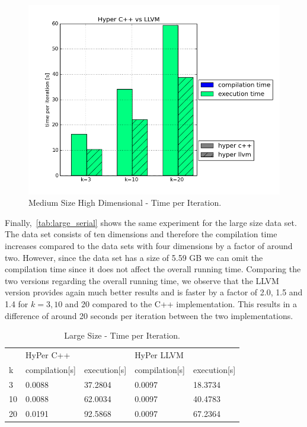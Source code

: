 \begin{figure}[htsb]
  \centering
  \includegraphics[scale=0.5, trim="0cm 1.5cm 0cm 0cm"]{figures/charts/hyper_15Mxhd}
  \caption[Medium Size High Dimensional - Time per Iteration (Serial)]{Medium Size High Dimensional - Time per Iteration.}
  \label{fig:hyper_15Mxhd}
\end{figure}


Finally,~\autoref{tab:large_serial} shows the same experiment for the large size data set. The data set consists of ten dimensions and therefore the compilation time increases compared to the data sets with four dimensions by a factor of around two. However, since the data set has a size of 5.59 GB we can omit the compilation time since it does not affect the overall running time. Comparing the two versions regarding the overall running time, we observe that the LLVM version provides again much better results and is faster by a factor of 2.0, 1.5 and 1.4 for $k = 3, 10$ and 20 compared to the C++ implementation. This results in a difference of around 20 seconds per iteration between the two implementations.



\begin{table}[htsb]
  \caption[Large Size - Time per Iteration (Serial)]{Large Size - Time per Iteration.}
  \label{tab:large_serial}
  \centering
  \begin{tabular}{l l l l l}
    \toprule
      & HyPer C++ & & HyPer LLVM & \\
      k & compilation[s] & execution[s] & compilation[s] & execution[s] \\
    \midrule
      3  & 0.0088 & 37.2804 & 0.0097 & 18.3734 \\
      10 & 0.0088 & 62.0034 & 0.0097 & 40.4783 \\
      20 & 0.0191 & 92.5868 & 0.0097 & 67.2364 \\
    \bottomrule
  \end{tabular}
\end{table}


